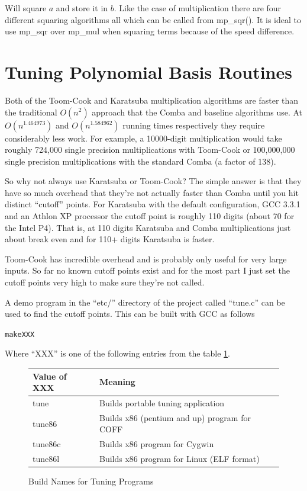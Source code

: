 \documentclass[synpaper]{book}
\begin{document}
Will square $a$ and store it in $b$.  Like the case of multiplication there are four different squaring
algorithms all which can be called from mp\_sqr().  It is ideal to use mp\_sqr over mp\_mul when squaring terms because
of the speed difference.  

\section{Tuning Polynomial Basis Routines}

Both of the Toom-Cook and Karatsuba multiplication algorithms are faster than the traditional $O(n^2)$ approach that
the Comba and baseline algorithms use.  At $O(n^{1.464973})$ and $O(n^{1.584962})$ running times respectively they require 
considerably less work.  For example, a 10000-digit multiplication would take roughly 724,000 single precision
multiplications with Toom-Cook or 100,000,000 single precision multiplications with the standard Comba (a factor
of 138).

So why not always use Karatsuba or Toom-Cook?   The simple answer is that they have so much overhead that they're not
actually faster than Comba until you hit distinct  ``cutoff'' points.  For Karatsuba with the default configuration, 
GCC 3.3.1 and an Athlon XP processor the cutoff point is roughly 110 digits (about 70 for the Intel P4).  That is, at 
110 digits Karatsuba and Comba multiplications just about break even and for 110+ digits Karatsuba is faster.

Toom-Cook has incredible overhead and is probably only useful for very large inputs.  So far no known cutoff points 
exist and for the most part I just set the cutoff points very high to make sure they're not called.

A demo program in the ``etc/'' directory of the project called ``tune.c'' can be used to find the cutoff points.  This
can be built with GCC as follows

\begin{alltt}
make XXX
\end{alltt}
Where ``XXX'' is one of the following entries from the table \ref{fig:tuning}.

\begin{figure}[here]
\begin{center}
\begin{small}
\begin{tabular}{|l|l|}
\hline \textbf{Value of XXX} & \textbf{Meaning} \\
\hline tune & Builds portable tuning application \\
\hline tune86 & Builds x86 (pentium and up) program for COFF \\
\hline tune86c & Builds x86 program for Cygwin \\
\hline tune86l & Builds x86 program for Linux (ELF format) \\
\hline
\end{tabular}
\end{small}
\end{center}
\caption{Build Names for Tuning Programs}
\label{fig:tuning}
\end{figure}
\end{document}
